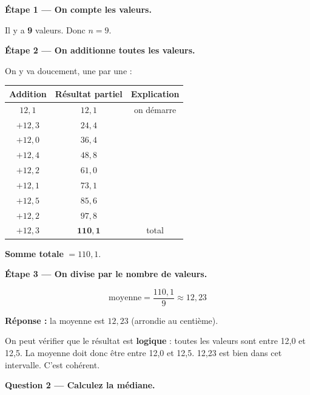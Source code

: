 \documentclass[12pt,a4paper]{article}
\begin{document}
\vspace{0.3cm}
\textbf{Étape 1 — On compte les valeurs.}

Il y a \textbf{9} valeurs. Donc $n = 9$.

\vspace{0.3cm}
\textbf{Étape 2 — On additionne toutes les valeurs.}

On y va doucement, une par une :

\begin{center}
\begin{tabular}{|c|c|c|}
\hline
\textbf{Addition} & \textbf{Résultat partiel} & \textbf{Explication} \\
\hline
$12{,}1$ & $12{,}1$ & on démarre \\
\hline
$+ 12{,}3$ & $24{,}4$ & \\
\hline
$+ 12{,}0$ & $36{,}4$ & \\
\hline
$+ 12{,}4$ & $48{,}8$ & \\
\hline
$+ 12{,}2$ & $61{,}0$ & \\
\hline
$+ 12{,}1$ & $73{,}1$ & \\
\hline
$+ 12{,}5$ & $85{,}6$ & \\
\hline
$+ 12{,}2$ & $97{,}8$ & \\
\hline
$+ 12{,}3$ & $\mathbf{110{,}1}$ & total \\
\hline
\end{tabular}
\end{center}

\textbf{Somme totale} $= 110{,}1$.

\vspace{0.3cm}
\textbf{Étape 3 — On divise par le nombre de valeurs.}

\[
\text{moyenne} = \frac{110{,}1}{9} \approx 12{,}23
\]

\vspace{0.3cm}
\textbf{Réponse :} la moyenne est $\boxed{12{,}23}$ (arrondie au centième).

\begin{enclair}
On peut vérifier que le résultat est \textbf{logique} : toutes les valeurs sont entre 12,0 et 12,5. La moyenne doit donc être entre 12,0 et 12,5. 12,23 est bien dans cet intervalle. C'est cohérent.
\end{enclair}

\vspace{0.5cm}

\begin{correctionbox}
\textbf{Question 2 — Calculez la médiane.}
\end{correctionbox}
\end{document}
